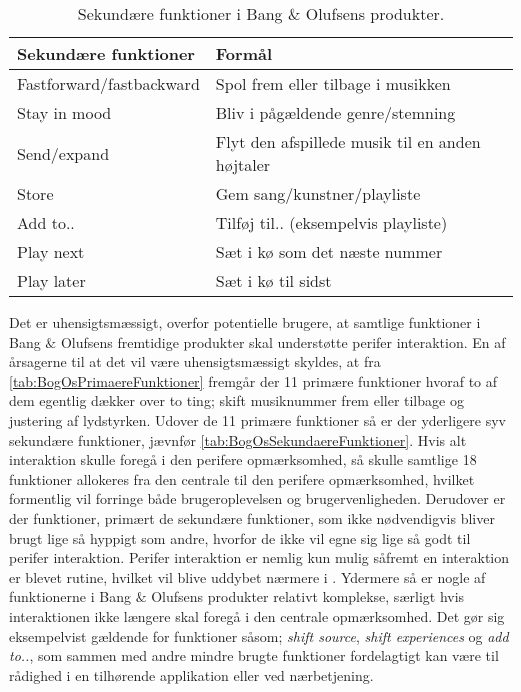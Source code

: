 \noindent
%
%
\begin{table}[H]
	\centering
	\begin{tabular}{ | l | p{8cm} |}
		\hline
		\multicolumn{1}{|l|}{\textbf{Sekundære funktioner}} & \multicolumn{1}{l|}{\textbf{Formål}} \\ \hline
		Fastforward/fastbackward & Spol frem eller tilbage i musikken \\ \hline
		Stay in mood & Bliv i pågældende genre/stemning \\ \hline
		Send/expand & Flyt den afspillede musik til en anden højtaler \\ \hline
		Store & Gem sang/kunstner/playliste \\ \hline
		Add to.. & Tilføj til.. (eksempelvis playliste) \\ \hline
		Play next & Sæt i kø som det næste nummer \\ \hline
		Play later & Sæt i kø til sidst \\ \hline
	\end{tabular}
	\caption{Sekundære funktioner i Bang $\&$ Olufsens produkter.}
	\label{tab:BogOsSekundaereFunktioner}
\end{table}
\noindent
%
Det er uhensigtsmæssigt, overfor potentielle brugere, at samtlige funktioner i Bang $\&$ Olufsens fremtidige produkter skal understøtte perifer interaktion. En af årsagerne til at det vil være uhensigtsmæssigt skyldes, at fra \autoref{tab:BogOsPrimaereFunktioner} fremgår der 11 primære funktioner hvoraf to af dem egentlig dækker over to ting; skift musiknummer frem eller tilbage og justering af lydstyrken. Udover de 11 primære funktioner så er der yderligere syv sekundære funktioner, jævnfør \autoref{tab:BogOsSekundaereFunktioner}. Hvis alt interaktion skulle foregå i den perifere opmærksomhed, så skulle samtlige 18 funktioner allokeres fra den centrale til den perifere opmærksomhed, hvilket formentlig vil forringe både brugeroplevelsen og brugervenligheden. Derudover er der funktioner, primært de sekundære funktioner, som ikke nødvendigvis bliver brugt lige så hyppigt som andre, hvorfor de ikke vil egne sig lige så godt til perifer interaktion. Perifer interaktion er nemlig kun mulig såfremt en interaktion er blevet rutine, hvilket vil blive uddybet nærmere i . Ydermere så er nogle af funktionerne i Bang $\&$ Olufsens produkter relativt komplekse, særligt hvis interaktionen ikke længere skal foregå i den centrale opmærksomhed. Det gør sig eksempelvist gældende for funktioner såsom; \textit{shift source}, \textit{shift experiences} og \textit{add to..}, som sammen med andre mindre brugte funktioner fordelagtigt kan være til rådighed i en tilhørende applikation eller ved nærbetjening.  

